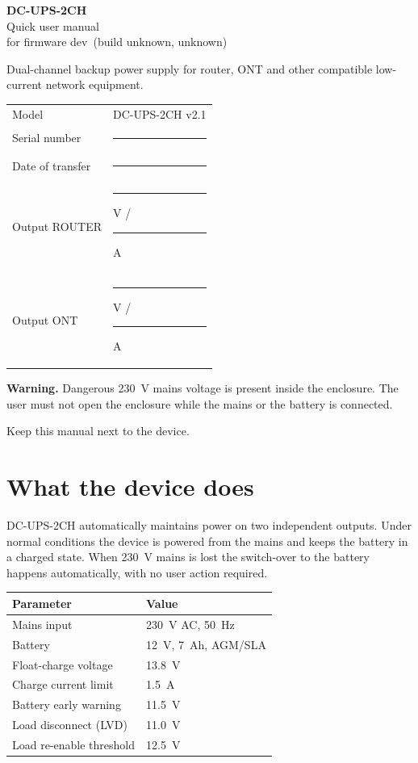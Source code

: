 \documentclass[10.5pt,a5paper]{article}
\newcommand{\hwversion}{v2.1}%
\newcommand{\fwversion}{dev}%
\newcommand{\builddate}{unknown}%
\newcommand{\buildcommit}{unknown}%
\begin{document}
\begin{titlepage}
\centering
\vspace*{10mm}
{\sffamily\bfseries\fontsize{24}{28}\selectfont DC-UPS-2CH\\[2mm]}
{\sffamily\Large Quick user manual\\[5mm]}
{\sffamily\small for firmware \fwversion\ (build \buildcommit, \builddate)}

\vspace{9mm}
\begin{infobox}
\centering
Dual-channel backup power supply for router, ONT and other compatible low-current network equipment.
\end{infobox}

\vspace{7mm}
\begin{tabularx}{\textwidth}{@{}lX@{}}
\toprule
Model & DC-UPS-2CH \hwversion \\
Serial number & \rule{45mm}{0.4pt} \\
Date of transfer & \rule{45mm}{0.4pt} \\
Output ROUTER & \rule{18mm}{0.4pt} V / \rule{18mm}{0.4pt} A \\
Output ONT & \rule{18mm}{0.4pt} V / \rule{18mm}{0.4pt} A \\
\bottomrule
\end{tabularx}

\vfill
\begin{warnbox}
\textbf{Warning.} Dangerous 230~V mains voltage is present inside the enclosure. The user must not open the enclosure while the mains or the battery is connected.
\end{warnbox}
\vfill
{\small Keep this manual next to the device.}
\end{titlepage}

\section{What the device does}

DC-UPS-2CH automatically maintains power on two independent outputs. Under normal conditions the device is powered from the mains and keeps the battery in a charged state. When 230~V mains is lost the switch-over to the battery happens automatically, with no user action required.

\begin{tabularx}{\textwidth}{@{}p{44mm}X@{}}
\toprule
\textbf{Parameter} & \textbf{Value} \\
\midrule
Mains input & 230~V AC, 50~Hz \\
Battery & 12~V, 7~Ah, AGM/SLA \\
Float-charge voltage & 13.8~V \\
Charge current limit & 1.5~A \\
Battery early warning & 11.5~V \\
Load disconnect (LVD) & 11.0~V \\
Load re-enable threshold & 12.5~V \\
\bottomrule
\end{tabularx}
\end{document}
